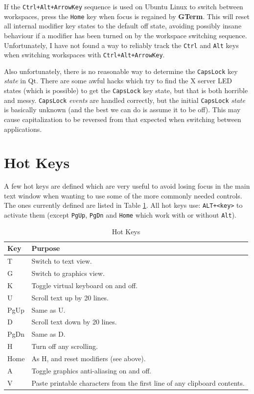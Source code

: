 \documentclass[a4paper,twoside,11pt]{article}
\newcommand{\newpara}{\par\vspace{4mm}\noindent}
\begin{document}
\newpara
If the \texttt{Ctrl+Alt+ArrowKey} sequence is used on Ubuntu Linux to switch between workspaces, press 
the \texttt{Home} key when focus is regained by \textbf{GTerm}. This will reset all internal modifier key states
to the default off state, avoiding possibly insane behaviour if a modifier has been turned on by
the workspace switching sequence.
Unfortunately, I have not found a way to reliably
track the \texttt{Ctrl} and \texttt{Alt} keys when switching workspaces with \texttt{Ctrl+Alt+ArrowKey}.
\newpara
Also unfortunately, there is no reasonable way to determine the \texttt{CapsLock} key \textit{state}
in Qt. There are some awful hacks which try to find the X server LED states (which is possible) to
get the \texttt{CapsLock} key state, but that is both horrible and messy. 
\texttt{CapsLock} \textit{events} are handled correctly,
but the initial \texttt{CapsLock} \textit{state} is basically unknown (and the
best we can do is assume it to be off). This may cause capitalization to be reversed from
that expected when switching between applications.

\section{Hot Keys}
A few hot keys are defined which are very useful to avoid losing focus in the main text window when
wanting to use some of the more commonly needed controls. The ones currently defined are listed in
Table \ref{tab:hotkeys}. All hot keys use: \texttt{ALT+<key>} to activate them (except \texttt{PgUp},
\texttt{PgDn} and \texttt{Home} which work with or without \texttt{Alt}).

\begin{table}
\centering
\begin{tabular}{|| l | l ||}
\hline
Key & Purpose\\
\hline
T  & Switch to text view.\\
G  & Switch to graphics view.\\
K  & Toggle virtual keyboard on and off.\\
U  & Scroll text up by 20 lines.\\
PgUp  & Same as U.\\
D  & Scroll text down by 20 lines.\\
PgDn  & Same as D.\\
H  & Turn off any scrolling.\\
Home & As H, and reset modifiers (see above). \\
A  & Toggle graphics anti-aliasing on and off.\\
V & Paste printable characters from the first line of any clipboard contents.\\
\hline
\end{tabular}
\caption{Hot Keys}
\label{tab:hotkeys}
\end{table}
\end{document}
